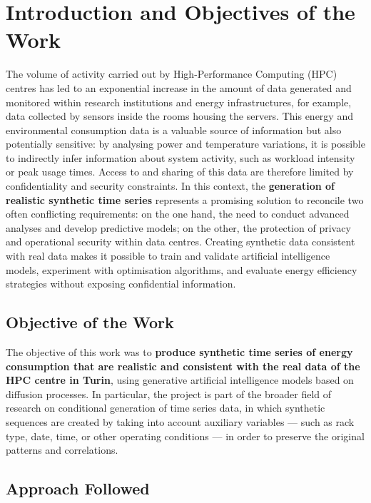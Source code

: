 \chapter{Introduction and Objectives of the Work}
\label{chap:intro_eng}

The volume of activity carried out by High-Performance Computing (HPC) centres has led to an exponential increase in the amount of data generated and monitored within research institutions and energy infrastructures, for example, data collected by sensors inside the rooms housing the servers.  
This energy and environmental consumption data is a valuable source of information but also potentially sensitive: by analysing power and temperature variations, it is possible to indirectly infer information about system activity, such as workload intensity or peak usage times.  
Access to and sharing of this data are therefore limited by confidentiality and security constraints.  
In this context, the \textbf{generation of realistic synthetic time series} represents a promising solution to reconcile two often conflicting requirements: on the one hand, the need to conduct advanced analyses and develop predictive models; on the other, the protection of privacy and operational security within data centres.  
Creating synthetic data consistent with real data makes it possible to train and validate artificial intelligence models, experiment with optimisation algorithms, and evaluate energy efficiency strategies without exposing confidential information.

\section*{Objective of the Work}

The objective of this work was to \textbf{produce synthetic time series of energy consumption that are realistic and consistent with the real data of the HPC centre in Turin}, using generative artificial intelligence models based on diffusion processes.  
In particular, the project is part of the broader field of research on conditional generation of time series data, in which synthetic sequences are created by taking into account auxiliary variables --- such as rack type, date, time, or other operating conditions --- in order to preserve the original patterns and correlations.

\section*{Approach Followed}

